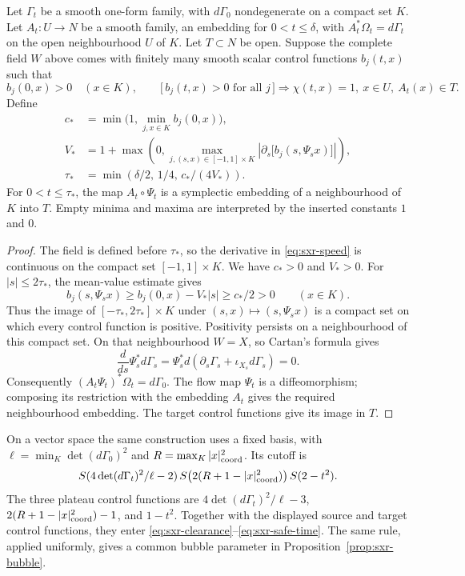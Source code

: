 \begin{lemma}\label{lem:sxr-exact}
Let $\Gamma_t$ be a smooth one-form family, with $d\Gamma_0$ nondegenerate on a
compact set $K$. Let $A_t:U\to N$ be a smooth family, an embedding for
$0<t\le\delta$, with $A_t^*\Omega_t=d\Gamma_t$ on the open neighbourhood $U$ of
$K$. Let $T\subset N$ be open. Suppose the complete field $W$ above
comes with finitely many smooth scalar control functions $b_j(t,x)$ such that
\[
 b_j(0,x)>0\quad(x\in K),\qquad
 \bigl[\,b_j(t,x)>0\text{ for all }j\,\bigr]
 \Longrightarrow \chi(t,x)=1,\ x\in U,\ A_t(x)\in T.
\]
Define
\begin{align}
 c_*&=\min\bigl(1,\min_{j,x\in K} b_j(0,x)\bigr),\label{eq:sxr-clearance}\\
 V_*&=1+\max\left(0,\max_{j,(s,x)\in[-1,1]\times K}
   \left|\partial_s\bigl[b_j(s,\Psi_sx)\bigr]\right|\right),\label{eq:sxr-speed}\\
 \tau_*&=\min\left(\delta/2,\,1/4,\,c_*/(4V_*)\right).\label{eq:sxr-safe-time}
\end{align}
For $0<t\le\tau_*$, the map $A_t\circ\Psi_t$ is a symplectic embedding of a
neighbourhood of $K$ into $T$. Empty minima and maxima are interpreted by the
inserted constants $1$ and $0$.
\end{lemma}

\begin{proof}
The field is defined before $\tau_*$, so the derivative in
\eqref{eq:sxr-speed} is continuous on the compact set $[-1,1]\times K$.
We have $c_*>0$ and $V_*>0$. For $|s|\le2\tau_*$, the mean-value estimate gives
\[
 b_j(s,\Psi_sx)\ge b_j(0,x)-V_*|s|\ge c_*/2>0
 \qquad(x\in K).
\]
Thus the image of $[-\tau_*,2\tau_*]\times K$ under
$(s,x)\mapsto(s,\Psi_sx)$ is a compact set on which every control function is
positive. Positivity persists on a neighbourhood of this compact set. On that
neighbourhood $W=X$, so Cartan's formula gives
\[
 \frac d{ds}\Psi_s^*d\Gamma_s
 =\Psi_s^*d(\partial_s\Gamma_s+\iota_{X_s}d\Gamma_s)=0.
\]
Consequently $(A_t\Psi_t)^*\Omega_t=d\Gamma_0$. The flow map $\Psi_t$ is a
diffeomorphism; composing its restriction with the embedding $A_t$ gives the
required neighbourhood embedding. The target control functions give its image in $T$.
\end{proof}

On a vector space the same construction uses a fixed basis, with
$\ell=\min_K\det(d\Gamma_0)^2$ and
$R=\max_K |x|_{\rm coord}^2$. Its cutoff is
\[
 S(4\det(d\Gamma_t)^2/\ell-2)\,
 S\bigl(2(R+1-|x|_{\rm coord}^2)\bigr)\,S(2-t^2).
\]
The three plateau control functions are
$4\det(d\Gamma_t)^2/\ell-3$, $2(R+1-|x|_{\rm coord}^2)-1$, and $1-t^2$.
Together with the displayed source and target control functions, they enter
\eqref{eq:sxr-clearance}--\eqref{eq:sxr-safe-time}.
The same rule, applied uniformly, gives a common bubble parameter in Proposition~\ref{prop:sxr-bubble}.

